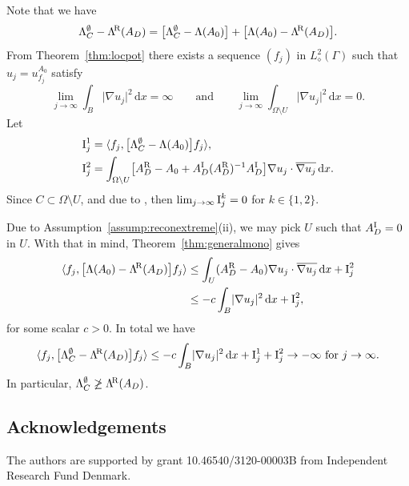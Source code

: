 \documentclass[reqno]{amsart}
\numberwithin{equation}{section}
\numberwithin{figure}{section}
\numberwithin{table}{section}
\theoremstyle{plain}
\theoremstyle{definition}
\theoremstyle{remark}
\newcommand{\abs}[1]{\lvert#1\rvert}
\newcommand{\inner}[1]{\langle#1\rangle}
\newcommand{\di}{\mathrm{d}}   %
\newcommand{\upR}{^{\textup{R}}}
\newcommand{\upI}{^{\textup{I}}}
\newcommand{\uptR}{^{\!\textup{R}}}
\newcommand{\LambdaR}{\Lambda\uptR}
\newcommand{\AR}{A\upR}
\newcommand{\AI}{A\upI}
\begin{document}
	Note that we have
	\begin{equation*}
		\Lambda_C^\emptyset - \LambdaR(A_D) = \bigl[\Lambda_C^\emptyset - \Lambda(A_0)\bigr] + \bigl[\Lambda(A_0) - \LambdaR(A_D)\bigr].
	\end{equation*}
	From Theorem~\ref{thm:locpot} there exists a sequence $(f_j)$ in $L^2_\diamond(\Gamma)$ such that $u_j = u_{f_j}^{A_0}$ satisfy
	\begin{equation*}
		\lim_{j\to\infty} \int_B \abs{\nabla u_j}^2\,\di x = \infty \qquad \text{and} \qquad \lim_{j\to\infty}\int_{\Omega\setminus U} \abs{\nabla u_j}^2\,\di x = 0.
	\end{equation*}
	Let
	\begin{align*}
		\textup{I}_j^1 &= \inner{f_j,\bigl[\Lambda_C^\emptyset - \Lambda(A_0)\bigr]f_j}, \\
		\textup{I}_j^2 &= \int_{\Omega\setminus U} \bigl[\AR_D - A_0 + \AI_D(\AR_D)^{-1}\AI_D\bigr]\nabla u_j\cdot\overline{\nabla u_j}\,\di x.
	\end{align*}
	Since $C\subset \Omega\setminus U$, and due to \cite[propositions~14.3 and~15.1]{GJZ2025}, then $\lim_{j\to\infty} \textup{I}_j^k = 0$ for $k\in\{1,2\}$.	
	
	Due to Assumption~\ref{assump:reconextreme}(ii), we may pick $U$ such that $\AI_D = 0$ in $U$. With that in mind, Theorem~\ref{thm:generalmono} gives
	\begin{align*}
		\inner{f_j,\bigl[\Lambda(A_0) - \LambdaR(A_D)\bigr]f_j} &\leq \int_U (\AR_D - A_0)\nabla u_j\cdot\overline{\nabla u_j}\,\di x + \textup{I}_j^2 \\
		&\leq -c\int_B\abs{\nabla u_j}^2\,\di x + \textup{I}_j^2,
	\end{align*}
	for some scalar $c>0$. In total we have
	\begin{equation*}
		\inner{f_j,\bigl[\Lambda_C^\emptyset - \LambdaR(A_D)\bigr]f_j} \leq -c\int_B\abs{\nabla u_j}^2\,\di x + \textup{I}_j^1 + \textup{I}_j^2 \to -\infty \text{ for } j\to\infty.
	\end{equation*}
	In particular, $\Lambda_C^\emptyset \not\geq \LambdaR(A_D)$.
	
	\subsection*{Acknowledgements}
	
	The authors are supported by grant 10.46540/3120-00003B from Independent Research Fund Denmark.
	
	\appendix
\end{document}

